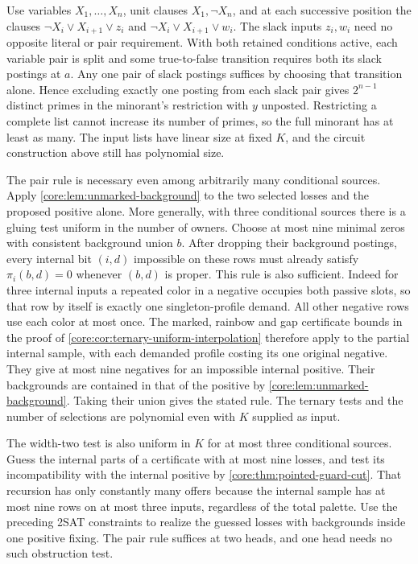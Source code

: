 Use variables $X_1,\ldots,X_n$, unit clauses
$X_1,\neg X_n$, and at each successive position
the clauses $\neg X_i\lor X_{i+1}\lor z_i$
and $\neg X_i\lor X_{i+1}\lor w_i$. The slack
inputs $z_i,w_i$ need no opposite literal
or pair requirement. With both retained
conditions active, each variable pair is split
and some true-to-false transition requires
both its slack postings at $a$. Any one
pair of slack postings suffices by choosing
that transition alone. Hence excluding exactly
one posting from each slack pair gives
$2^{n-1}$ distinct primes in the minorant's
restriction with $y$ unposted. Restricting
a complete list cannot increase its number
of primes, so the full minorant has at least
as many. The input lists have linear size
at fixed $K$, and the circuit construction
above still has polynomial size.

The pair rule is necessary even among arbitrarily many conditional
sources. Apply \cref{core:lem:unmarked-background} to the two
selected losses and the proposed positive alone. More generally,
with three conditional sources there is a gluing test uniform
in the number of owners. Choose at most nine minimal zeros with
consistent background union $b$. After dropping their background
postings, every internal bit $(i,d)$ impossible on these rows must
already satisfy $\pi_i(b,d)=0$ whenever $(b,d)$ is proper.
This rule is also sufficient. Indeed for three internal inputs a
repeated color in a negative occupies both passive slots, so that
row by itself is exactly one singleton-profile demand. All other
negative rows use each color at most once. The marked, rainbow and
gap certificate bounds in the proof of
\cref{core:cor:ternary-uniform-interpolation} therefore apply to
the partial internal sample, with each demanded profile costing
its one original negative. They give at most nine negatives for
an impossible internal positive. Their backgrounds are contained
in that of the positive by \cref{core:lem:unmarked-background}.
Taking their union gives the stated rule. The ternary tests and the
number of selections are polynomial even with $K$ supplied as input.

The width-two test is also uniform in $K$ for at most
three conditional sources. Guess the internal parts
of a certificate with at most nine losses, and test
its incompatibility with the internal positive by
\cref{core:thm:pointed-guard-cut}. That recursion has
only constantly many offers because the internal sample
has at most nine rows on at most three inputs, regardless
of the total palette. Use the preceding 2SAT constraints
to realize the guessed losses with backgrounds inside
one positive fixing. The pair rule suffices at two
heads, and one head needs no such obstruction test.

